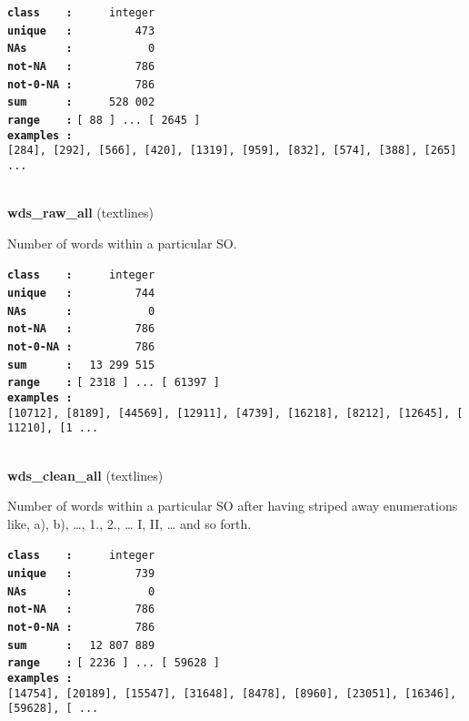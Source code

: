 \documentclass[]{article}
\begin{document}
\textbf{\texttt{class\ \ \ \ :}} \texttt{~~~~~integer}\\
\textbf{\texttt{unique\ \ \ :}} \texttt{~~~~~~~~~473}\\
\textbf{\texttt{NAs\ \ \ \ \ \ :}} \texttt{~~~~~~~~~~~0}\\
\textbf{\texttt{not-NA\ \ \ :}} \texttt{~~~~~~~~~786}\\
\textbf{\texttt{not-0-NA\ :}} \texttt{~~~~~~~~~786}\\
\textbf{\texttt{sum\ \ \ \ \ \ :}} \texttt{~~~~~528~002}\\
\textbf{\texttt{range\ \ \ \ :}}
\texttt{{[}\ 88\ {]}\ ...\ {[}\ 2645\ {]}}\\
\textbf{\texttt{examples\ :}}
\texttt{{[}284{]},\ {[}292{]},\ {[}566{]},\ {[}420{]},\ {[}1319{]},\ {[}959{]},\ {[}832{]},\ {[}574{]},\ {[}388{]},\ {[}265{]}\ ...}\\

~

\textbf{wds\_raw\_all} (textlines)

Number of words within a particular SO.

\textbf{\texttt{class\ \ \ \ :}} \texttt{~~~~~integer}\\
\textbf{\texttt{unique\ \ \ :}} \texttt{~~~~~~~~~744}\\
\textbf{\texttt{NAs\ \ \ \ \ \ :}} \texttt{~~~~~~~~~~~0}\\
\textbf{\texttt{not-NA\ \ \ :}} \texttt{~~~~~~~~~786}\\
\textbf{\texttt{not-0-NA\ :}} \texttt{~~~~~~~~~786}\\
\textbf{\texttt{sum\ \ \ \ \ \ :}} \texttt{~~13~299~515}\\
\textbf{\texttt{range\ \ \ \ :}}
\texttt{{[}\ 2318\ {]}\ ...\ {[}\ 61397\ {]}}\\
\textbf{\texttt{examples\ :}}
\texttt{{[}10712{]},\ {[}8189{]},\ {[}44569{]},\ {[}12911{]},\ {[}4739{]},\ {[}16218{]},\ {[}8212{]},\ {[}12645{]},\ {[}11210{]},\ {[}1\ ...}\\

~

\textbf{wds\_clean\_all} (textlines)

Number of words within a particular SO after having striped away
enumerations like, a), b), \ldots{}, 1., 2., \ldots{} I, II, \ldots{}
and so forth.

\textbf{\texttt{class\ \ \ \ :}} \texttt{~~~~~integer}\\
\textbf{\texttt{unique\ \ \ :}} \texttt{~~~~~~~~~739}\\
\textbf{\texttt{NAs\ \ \ \ \ \ :}} \texttt{~~~~~~~~~~~0}\\
\textbf{\texttt{not-NA\ \ \ :}} \texttt{~~~~~~~~~786}\\
\textbf{\texttt{not-0-NA\ :}} \texttt{~~~~~~~~~786}\\
\textbf{\texttt{sum\ \ \ \ \ \ :}} \texttt{~~12~807~889}\\
\textbf{\texttt{range\ \ \ \ :}}
\texttt{{[}\ 2236\ {]}\ ...\ {[}\ 59628\ {]}}\\
\textbf{\texttt{examples\ :}}
\texttt{{[}14754{]},\ {[}20189{]},\ {[}15547{]},\ {[}31648{]},\ {[}8478{]},\ {[}8960{]},\ {[}23051{]},\ {[}16346{]},\ {[}59628{]},\ {[}\ ...}\\
\end{document}

